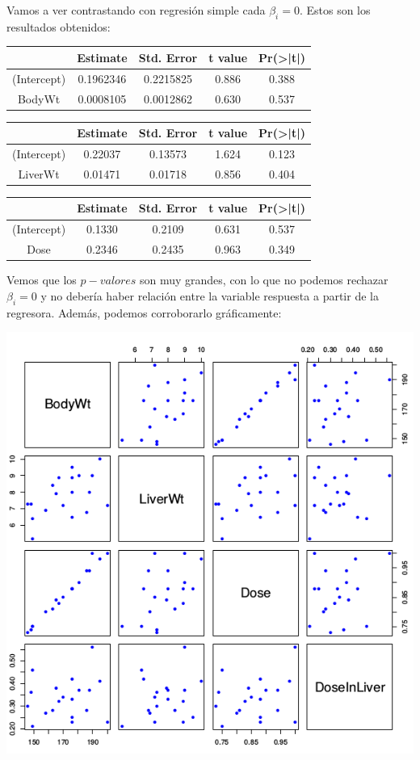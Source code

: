 Vamos a ver contrastando con regresión simple cada $β_i = 0$. Estos son los resultados obtenidos:
\begin{center}
\begin{tabular}{ccccc}
&Estimate&Std. Error&t value&Pr(>|t|)\\\hline
(Intercept)&0.1962346&0.2215825&0.886&0.388\\
BodyWt&0.0008105&0.0012862&0.630&0.537
\end{tabular}

\begin{tabular}{ccccc}
&Estimate&Std. Error&t value&Pr(>|t|)\\\hline
(Intercept)&0.22037&0.13573&1.624&0.123\\
LiverWt&0.01471&0.01718&0.856&0.404
\end{tabular}

\begin{tabular}{ccccc}
&Estimate&Std. Error&t value&Pr(>|t|) \\\hline
(Intercept)&0.1330&0.2109&0.631&0.537\\
Dose&0.2346&0.2435&0.963&0.349
\end{tabular}
\end{center}
Vemos que los $p-valores$ son muy grandes, con lo que no podemos rechazar $β_i = 0$ y no debería haber relación entre la variable respuesta a partir de la regresora. Además, podemos corroborarlo gráficamente:

\begin{center}
\includegraphics[scale=0.6]{img/DiagramaRatas.png}
\end{center}

